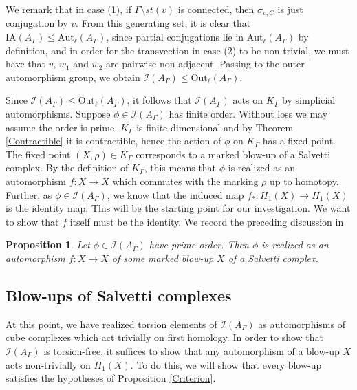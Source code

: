 \documentclass[11pt]{amsart}
\numberwithin{thm}{section}
\newtheorem{proposition}[thm]{Proposition}
\theoremstyle{remark}
\theoremstyle{definition}
\newcommand{\Aut}{\text{Aut}}
\newcommand{\Out}{\text{Out}}
\newcommand{\IA}{\text{IA}}
\begin{document}
We remark that in case (1), if $\Gamma\setminus st(v)$ is connected, then $\sigma_{v,C}$ is just conjugation by $v$.  From this generating set, it is clear that $\IA(A_\Gamma)\leq \Aut_{\ell}(A_\Gamma)$, since partial conjugations lie in $\Aut_{\ell}(A_\Gamma)$ by definition, and in order for the transvection in case (2) to be non-trivial, we must have that $v$, $w_1$ and $w_2$ are pairwise non-adjacent.  Passing to the outer automorphism group, we obtain $\mathcal{I}(A_\Gamma) \leq \Out_{\ell}(A_\Gamma)$.

Since $\mathcal{I}(A_\Gamma) \leq \Out_{\ell}(A_\Gamma)$, it follows that $\mathcal{I}(A_\Gamma)$ acts on $K_\Gamma$ by simplicial automorphisms.  Suppose $\phi\in \mathcal{I}(A_\Gamma)$ has finite order.  Without loss we may assume the order is prime.  $K_\Gamma$ is finite-dimensional and by Theorem \ref{Contractible} it is contractible, hence the action of $\phi$ on $K_\Gamma$ has a fixed point.  The fixed point $(X,\rho) \in K_\Gamma$ corresponds to a marked blow-up of a Salvetti complex.  By the definition of $K_\Gamma$, this means that $\phi$ is realized as an automorphism $f:X\rightarrow X$ which commutes with the marking $\rho$ up to homotopy.  Further, as $\phi\in \mathcal{I}(A_\Gamma)$, we know that the induced map $f_*:H_1(X)\rightarrow H_1(X)$ is the identity map.  This will be the starting point for our investigation.  We want to show that $f$ itself must be the identity.  We record the preceding discussion in 

\begin{proposition}\label{FixedSal}  Let $\phi\in \mathcal{I}(A_\Gamma)$ have prime order.  Then $\phi$ is realized as an automorphism $f:X\rightarrow X$ of some marked blow-up $X$ of a Salvetti complex.  
\end{proposition}

\subsection{Blow-ups of Salvetti complexes}
At this point, we have realized torsion elements of $\mathcal{I}(A_\Gamma)$ as automorphisms of cube complexes which act trivially on first homology. In order to show that $\mathcal{I}(A_\Gamma)$ is torsion-free, it suffices to show that any automorphism of a blow-up $X$ acts non-trivially on $H_1(X)$. To do this, we will show that every blow-up satisfies the hypotheses of Proposition \ref{Criterion}. 
\end{document}
